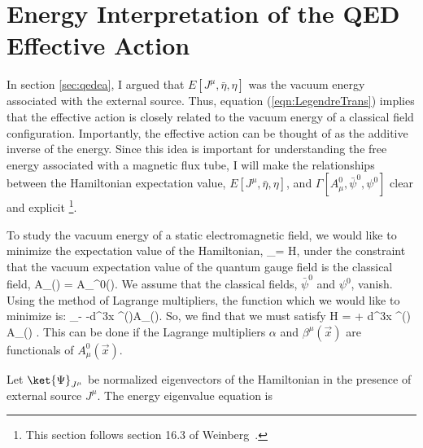\section{Energy Interpretation of the \texorpdfstring{\acs{QED}}{QED} Effective Action}

In section \ref{sec:qedea}, I argued that $E[J^\mu, \bar{\eta},\eta]$ was the 
vacuum energy associated with the external source. Thus, equation (\ref{eqn:LegendreTrans})
implies that the effective action is closely related to the vacuum energy of a 
classical field configuration. Importantly, the effective action 
can be thought of as the additive inverse of the energy. 
Since this idea is important for understanding 
the free energy associated with a magnetic flux tube, I will make the relationships 
between the Hamiltonian expectation value, $E[J^\mu, \bar{\eta},\eta]$, 
and $\Gamma[A^0_\mu, \bar{\psi}^0, \psi^0]$ clear and explicit
\footnote{This section follows section 16.3 of Weinberg~\cite{weinberg1966quantum}.}.

To study the vacuum energy of a static electromagnetic field, we would like to 
minimize the expectation value of the Hamiltonian, 
\be
	_\Omega = \bra{\Omega}H\ket{\Omega},
\ee
under the constraint that the vacuum expectation value of the quantum gauge 
field is the classical field,
\be
	\bra{\Omega}A_\mu()\ket{\Omega} = A_\mu^0().
\ee
We assume that the classical fields, $\bar{\psi}^0$ and $\psi^0$, vanish.
Using the method of Lagrange multipliers, the function which we would like to 
minimize is:
\be
	_\Omega - \alpha\braket{\Omega}{\Omega}
	-\int d^3x \beta^\mu()\bra{\Omega}A_\mu()\ket{\Omega}.
\ee
So, we find that we must satisfy
\be
	\label{eqn:Hmin}
	H\ket{\Omega} = \alpha\ket{\Omega} + \int d^3x 
	\beta^\mu() A_\mu() \ket{\Omega}.
\ee
This can be done if the Lagrange multipliers 
$\alpha$ and $\beta^\mu(\vec{x})$ are functionals of $A_\mu^0(\vec{x})$.

Let $\ket{\Psi}_{J^\mu}$ be normalized eigenvectors of the Hamiltonian in the presence of 
external source $J^\mu$. The energy eigenvalue equation is 

